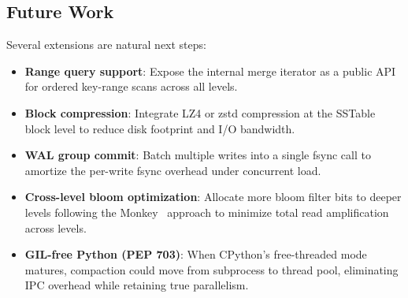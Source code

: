 \documentclass[conference]{IEEEtran}
\begin{document}
\subsection{Future Work}

Several extensions are natural next steps:

\begin{itemize}[leftmargin=*]
    \item \textbf{Range query support}: Expose the internal merge iterator as a public API for ordered key-range scans across all levels.
    \item \textbf{Block compression}: Integrate LZ4 or zstd compression at the SSTable block level to reduce disk footprint and I/O bandwidth.
    \item \textbf{WAL group commit}: Batch multiple writes into a single fsync call to amortize the per-write fsync overhead under concurrent load.
    \item \textbf{Cross-level bloom optimization}: Allocate more bloom filter bits to deeper levels following the Monkey~\cite{dayan2017} approach to minimize total read amplification across levels.
    \item \textbf{GIL-free Python (PEP 703)}: When CPython's free-threaded mode matures, compaction could move from subprocess to thread pool, eliminating IPC overhead while retaining true parallelism.
\end{itemize}

\end{document}
